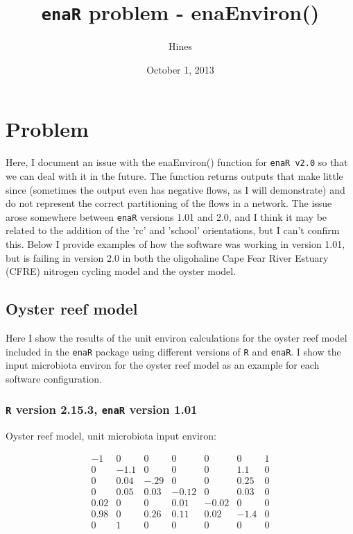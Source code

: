\documentclass[]{article}
\begin{document}
\title{\texttt{enaR} problem - enaEnviron()}
\author{Hines}
\date{October 1, 2013}
\maketitle

\section{Problem}

Here, I document an issue with the enaEnviron() function for
\texttt{enaR v2.0} so that we can deal with it in the future.  The
function returns outputs that make little since (sometimes the output
even has negative flows, as I will demonstrate) and do not represent
the correct partitioning of the flows in a network.  The issue arose
somewhere between \texttt{enaR} versions 1.01 and 2.0, and I think it
may be related to the addition of the 'rc' and 'school' orientations,
but I can't confirm this.  Below I provide examples of how the
software was working in version 1.01, but is failing in version 2.0 in
both the oligohaline Cape Fear River Estuary (CFRE) nitrogen cycling
model and the oyster model.

\subsection{Oyster reef model}

Here I show the results of the unit environ calculations for the oyster
reef model included in the \texttt{enaR} package using different
versions of \texttt{R} and \texttt{enaR}.   I show the input microbiota environ
for the oyster reef model as an example for each software configuration.

\subsubsection{\texttt{R} version 2.15.3, \texttt{enaR} version 1.01}

Oyster reef model, unit microbiota input environ:

\[
\begin{array}{ccccccc}
-1 & 0 & 0 & 0 & 0 & 0 & 1 \\
0 & -1.1 & 0 & 0 & 0 & 1.1 & 0 \\
0 & 0.04 & -.29 & 0 & 0 & 0.25 & 0 \\
0 & 0.05 & 0.03 & -0.12 & 0 & 0.03 & 0 \\
0.02 & 0 & 0 & 0.01 & -0.02 & 0 & 0 \\
0.98 & 0 & 0.26 & 0.11 & 0.02 & -1.4 & 0 \\
0 & 1 & 0 & 0 & 0 & 0 & 0 \\
\end{array}
\]
\end{document}
